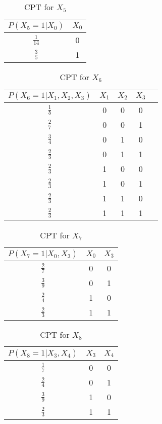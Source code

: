 \documentclass{article}
\begin{document}
\begin{table}[H]
\centering
\begin{tabular}{|c|c|}
\hline
$P(X_5 = 1 | X_0)$ & $X_0$ \\ \hline
$\frac{1}{14}$ & 0 \\ \hline
$\frac{3}{5}$ & 1 \\ \hline
\end{tabular}
\caption{CPT for $X_5$}
\end{table}

\begin{table}[H]
\centering
\begin{tabular}{|c|c|c|c|c|}
\hline
$P(X_6 = 1 | X_1, X_2, X_3)$ & $X_1$ & $X_2$ & $X_3$ \\ \hline
$\frac{1}{5}$ & 0 & 0 & 0 \\ \hline
$\frac{2}{7}$ & 0 & 0 & 1 \\ \hline
$\frac{3}{4}$ & 0 & 1 & 0 \\ \hline
$\frac{2}{3}$ & 0 & 1 & 1 \\ \hline
$\frac{2}{3}$ & 1 & 0 & 0 \\ \hline
$\frac{2}{3}$ & 1 & 0 & 1 \\ \hline
$\frac{2}{3}$ & 1 & 1 & 0 \\ \hline
$\frac{2}{3}$ & 1 & 1 & 1 \\ \hline
\end{tabular}
\caption{CPT for $X_6$}
\end{table}

\begin{table}[H]
\centering
\begin{tabular}{|c|c|c|}
\hline
$P(X_7 = 1 | X_0, X_3)$ & $X_0$ & $X_3$ \\ \hline
$\frac{2}{7}$ & 0 & 0 \\ \hline
$\frac{3}{9}$ & 0 & 1 \\ \hline
$\frac{2}{4}$ & 1 & 0 \\ \hline
$\frac{2}{3}$ & 1 & 1 \\ \hline
\end{tabular}
\caption{CPT for $X_7$}
\end{table}

\begin{table}[H]
\centering
\begin{tabular}{|c|c|c|}
\hline
$P(X_8 = 1 | X_3, X_4)$ & $X_3$ & $X_4$ \\ \hline
$\frac{1}{7}$ & 0 & 0 \\ \hline
$\frac{2}{4}$ & 0 & 1 \\ \hline
$\frac{3}{9}$ & 1 & 0 \\ \hline
$\frac{2}{3}$ & 1 & 1 \\ \hline
\end{tabular}
\caption{CPT for $X_8$}
\end{table}
\end{document}
